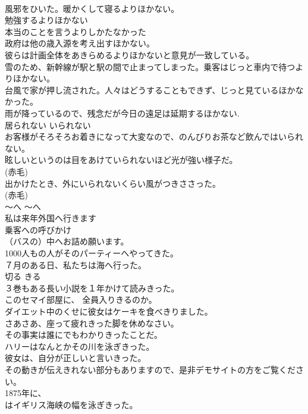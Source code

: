 \documentclass[8pt]{extreport}
\begin{document}
\begin{CJK}{UTF8}{min}
\\	風邪をひいた。暖かくして寝るよりほかない。  
\\	勉強するよりほかない  
\\	本当のことを言うよりしかたなかった  
\\	政府は他の歳入源を考え出すほかない。   
\\	彼らは計画全体をあきらめるよりほかないと意見が一致している。   
\\	雪のため、新幹線が駅と駅の間で止まってしまった。乗客はじっと車内で待つよりほかない。   
\\	台風で家が押し流された。人々はどうすることもできず、じっと見ているほかなかった。  
\\	雨が降っているので、残念だが今日の遠足は延期するほかない.  
\\	居られない	いられない	
\\	お客様がそろそろお着きになって大変なので、のんびりお茶など飲んではいられない。  
\\	眩しいというのは目をあけていられないほど光が強い様子だ。  
\\	(赤毛)
\\	出かけたとき、外にいられないくらい風がつきささった。  
\\	(赤毛)
\\	〜へ	〜へ	
\\	私は来年外国へ行きます  
\\	乗客への呼びかけ
\\	（バスの）中へお詰め願います。  
\\	1000人もの人がそのパーティーへやってきた。  
\\	７月のある日、私たちは海へ行った。  
\\	切る	きる	
\\	３巻もある長い小説を１年かけて読みきった。  
\\	このセマイ部屋に、 全員入りきるのか。  
\\	ダイエット中のくせに彼女はケーキを食べきりました。  
\\	さあさあ、座って疲れきった脚を休めなさい。  
\\	その事実は誰にでもわかりきったことだ。  
\\	ハリーはなんとかその川を泳ぎきった。  
\\	彼女は、自分が正しいと言いきった。  
\\	その動きが伝えきれない部分もありますので、是非デモサイトの方をご覧ください。   
\\	1875年に、
\\	はイギリス海峡の幅を泳ぎきった。   

\end{CJK}
\end{document}
